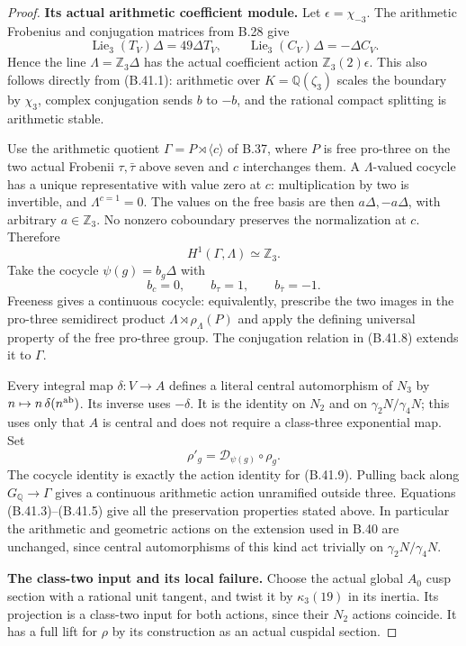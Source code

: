 \begin{proof}
\par\smallskip\noindent\textbf{Its actual arithmetic coefficient module.}\enspace
Let $\epsilon=\chi_{-3}$.  The arithmetic Frobenius and
conjugation matrices from B.28 give
\[
 \operatorname{Lie}_3(T_V)\Delta=49\Delta T_V,
 \qquad
 \operatorname{Lie}_3(C_V)\Delta=-\Delta C_V.               \tag{B.41.6}
\]
Hence the line $\Lambda=\mathbb Z_3\Delta$ has the actual
coefficient action $\mathbb Z_3(2)\epsilon$.  This also
follows directly from (B.41.1): arithmetic over
$K=\mathbb Q(\zeta_3)$ scales the boundary by $\chi_3$,
complex conjugation sends $b$ to $-b$, and the rational
compact splitting is arithmetic stable.

Use the arithmetic quotient $\Gamma=P\rtimes\langle c\rangle$
of B.37, where $P$ is free pro-three on the two actual
Frobenii $\tau,\bar\tau$ above seven and $c$ interchanges
them.  A $\Lambda$-valued cocycle has a unique representative
with value zero at $c$: multiplication by two is invertible,
and $\Lambda^{c=1}=0$.  The values on the free basis are then
$a\Delta,-a\Delta$, with arbitrary $a\in\mathbb Z_3$.
No nonzero coboundary preserves the normalization at $c$.
Therefore
\[
 H^1(\Gamma,\Lambda)\simeq\mathbb Z_3.                    \tag{B.41.7}
\]
Take the cocycle $\psi(g)=b_g\Delta$ with
\[
 b_c=0,\qquad b_\tau=1,\qquad b_{\bar\tau}=-1.             \tag{B.41.8}
\]
Freeness gives a continuous cocycle: equivalently, prescribe
the two images in the pro-three semidirect product
$\Lambda\rtimes\rho_\Lambda(P)$ and apply the defining
universal property of the free pro-three group.  The
conjugation relation in (B.41.8) extends it to $\Gamma$.

Every integral map $\delta:V\to A$ defines a literal central
automorphism of $N_3$ by $n\mapsto n\,\delta(n^{\rm ab})$.
Its inverse uses $-\delta$.  It is the identity on $N_2$
and on $\gamma_2N/\gamma_4N$; this uses only that $A$ is
central and does not require a class-three exponential map.
Set
\[
 \rho'_g=\mathcal D_{\psi(g)}\circ\rho_g.                 \tag{B.41.9}
\]
The cocycle identity is exactly the action identity for
(B.41.9).  Pulling back along $G_{\mathbb Q}\to\Gamma$
gives a continuous arithmetic action unramified outside
three.  Equations (B.41.3)--(B.41.5) give all the preservation
properties stated above.  In particular the arithmetic
and geometric actions on the extension used in B.40 are
unchanged, since central automorphisms of this kind act
trivially on $\gamma_2N/\gamma_4N$.

\par\smallskip\noindent\textbf{The class-two input and its local failure.}\enspace
Choose the actual global $A_0$ cusp section with a rational
unit tangent, and twist it by $\kappa_3(19)$ in its inertia.
Its projection is a class-two input for both actions, since
their $N_2$ actions coincide.  It has a full lift for $\rho$
by its construction as an actual cuspidal section.


\end{proof}
